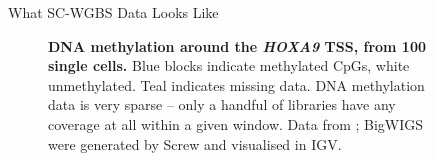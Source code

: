\documentclass{beamer}
\begin{document}
\begin{frame}
\begin{columns}[t]
\begin{column}{.32\textwidth}
\begin{block}{What SC-WGBS Data Looks Like}
\begin{figure}
\begin{center}
\end{center}
\caption{\textbf{DNA methylation around the \textit{HOXA9} TSS, from 100 single cells.}  Blue blocks indicate methylated CpGs, white unmethylated. Teal indicates missing data. DNA methylation data is very sparse -- only a handful of libraries have any coverage at all within a given window. Data from \cite{Farlik2016}; BigWIGS were generated by Screw and visualised in IGV.}
\end{figure}
\end{block}




\end{column}


\begin{column}{.65\textwidth}
\vspace*{-\baselineskip}
  \begin{columns}[t,totalwidth=\textwidth]
    \begin{column}{.48\textwidth}
    
	
	\end{column}

	\begin{column}{.48\textwidth}
	
	\end{column}
  \end{columns}


\end{column}
\end{columns}
\end{frame}
\end{document}
